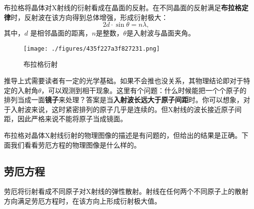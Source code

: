 布拉格将晶体对X射线的衍射看成在晶面的反射。在不同晶面的反射满足\textbf{布拉格定律}时，反射波在该方向得到总体增强，形成衍射极大：
\begin{equation}\label{eq_RecLat_1}
2d \cdot \sin\theta = n\lambda,~
\end{equation}
其中，$d$ 是相邻晶面的距离，$n$是整数，$\theta$是入射波与晶面夹角。
\begin{figure}[ht]
\centering
\texttt{[image: ./figures/435f227a3f827231.png]}
\caption{布拉格衍射} \label{fig_RecLat_2}
\end{figure}
推导上式需要读者有一定的光学基础。如果不会推也没关系，其物理结论即对于特定的入射角$\theta$，可以观测到相干现象。这里有个问题：什么时候能把一个个原子的排列当成一面\textbf{镜子}来处理？答案是当\textbf{入射波长远大于原子间距}时。你可以想象，对于入射波来说，这时紧密排列的原子几乎是连续的。但X射线的波长接近原子间距，因此严格来说不能将原子当成镜面。

布拉格对晶体X射线衍射的物理图像的描述是有问题的，但给出的结果是正确。下面我们看看劳厄方程的物理图像是什么样的。

\subsection{劳厄方程}
劳厄将衍射看成不同原子对X射线的弹性散射。射线在任何两个不同原子上的散射方向满足劳厄方程时，在该方向上形成衍射极大值。